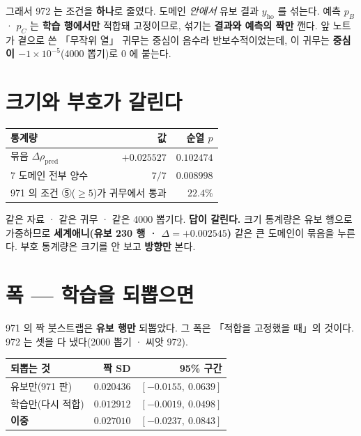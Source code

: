 \documentclass[10pt]{article}
\begin{document}

그래서 972 는 조건을 \textbf{하나}로 줄였다. 도메인 \emph{안에서} 유보 결과 $y_{\mathrm{ho}}$ 를
섞는다. 예측 $p_B$ · $p_C$ 는 \textbf{학습 행에서만} 적합돼 고정이므로, 섞기는
\textbf{결과와 예측의 짝만} 깬다. 앞 노트가 곁으로 쓴 「무작위 열」 귀무는 중심이 음수라
반보수적이었는데, 이 귀무는 \textbf{중심이 $-1\times10^{-5}$}(4000 뽑기)로 0 에 붙는다.

\section{크기와 부호가 갈린다}

\begin{center}\tsize
\begin{tabular}{lrr}
\toprule
통계량 & 값 & 순열 $p$ \\
\midrule
묶음 $\Delta\rho_{\mathrm{pred}}$ & $+0.025527$ & $\mathbf{0.102474}$ \\
7 도메인 전부 양수 & $7/7$ & $\mathbf{0.008998}$ \\
\midrule
\multicolumn{2}{l}{971 의 조건 ⑤($\ge 5$)가 귀무에서 통과} & $22.4\%$ \\
\bottomrule
\end{tabular}
\end{center}

같은 자료 · 같은 귀무 · 같은 4000 뽑기다. \textbf{답이 갈린다.}
크기 통계량은 유보 행으로 가중하므로 \textbf{세계애니(유보 230 행 · $\Delta = +0.002545$)}
같은 큰 도메인이 묶음을 누른다. 부호 통계량은 크기를 안 보고 \textbf{방향만} 본다.


\section{폭 --- 학습을 되뽑으면}

971 의 짝 붓스트랩은 \textbf{유보 행만} 되뽑았다. 그 폭은 「적합을 고정했을 때」의 것이다.
972 는 셋을 다 냈다(2000 뽑기 · 씨앗 972).

\begin{center}\tsize
\begin{tabular}{lrr}
\toprule
되뽑는 것 & 짝 SD & 95\% 구간 \\
\midrule
유보만(971 판) & $0.020436$ & $[-0.0155,\ 0.0639]$ \\
학습만(다시 적합) & $0.012912$ & $[-0.0019,\ 0.0498]$ \\
\textbf{이중} & $\mathbf{0.027010}$ & $[-0.0237,\ 0.0843]$ \\
\bottomrule
\end{tabular}
\end{center}
\end{document}
